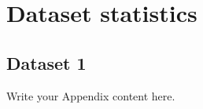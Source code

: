 
\chapter{Dataset statistics} %

\label{AppendixA} %

\section{Dataset 1}



Write your Appendix content here.